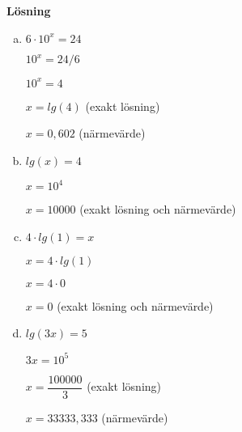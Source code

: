 \documentclass{article}
\begin{document}
\textbf{Lösning}

\begin{enumerate}[(a)]
\item $ 6 \cdot 10^x = 24 $

$ 10^x = 24 / 6 $

$ 10^x = 4 $

$ x = lg(4) $	\tab(exakt lösning)

$ x = 0,602 $	\tab(närmevärde)

\item $ lg(x) = 4 $

$ x = 10^4 $

$ x = 10000 $	\tab(exakt lösning och närmevärde)

\item $ 4 \cdot lg(1) = x $

$ x = 4 \cdot lg(1) $

$ x = 4 \cdot 0 $

$ x = 0 $	\tab(exakt lösning och närmevärde)

\item $ lg(3x) = 5 $

$ 3x = 10^5 $

$ x = \dfrac{100000}{3} $	\tab(exakt lösning)

$ x = 33333,333$	\tab(närmevärde)

\end{enumerate}
\end{document}
